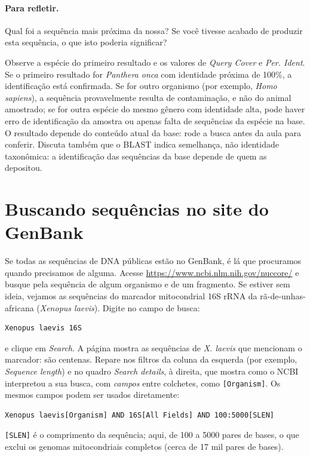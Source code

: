 \documentclass[11pt,a4paper]{article}
\newcommand{\ui}[1]{\textit{#1}}
\begin{document}
\paragraph{Para refletir.} Qual foi a sequência mais próxima da nossa? Se você tivesse acabado
de produzir esta sequência, o que isto poderia significar?

\begin{resposta}
Observe a espécie do primeiro resultado e os valores de \ui{Query Cover} e \ui{Per. Ident}.
Se o primeiro resultado for \emph{Panthera onca} com identidade próxima de 100\%, a
identificação está confirmada. Se for outro organismo (por exemplo, \emph{Homo sapiens}), a
sequência provavelmente resulta de contaminação, e não do animal amostrado; se for outra
espécie do mesmo gênero com identidade alta, pode haver erro de identificação da amostra ou
apenas falta de sequências da espécie na base. O resultado depende do conteúdo atual da base:
rode a busca antes da aula para conferir. Discuta também que o BLAST indica semelhança, não
identidade taxonômica: a identificação das sequências da base depende de quem as depositou.
\end{resposta}

\section{Buscando sequências no site do GenBank}

Se todas as sequências de DNA públicas estão no GenBank, é lá que procuramos quando precisamos
de alguma. Acesse \url{https://www.ncbi.nlm.nih.gov/nuccore/} e busque pela sequência de algum
organismo e de um fragmento. Se estiver sem ideia, vejamos as sequências do marcador
mitocondrial 16S rRNA da rã-de-unhas-africana (\emph{Xenopus laevis}). Digite no campo de busca:
\begin{Verbatim}
Xenopus laevis 16S
\end{Verbatim}
e clique em \ui{Search}. A página mostra as sequências de \emph{X. laevis} que mencionam o
marcador: são centenas. Repare nos filtros da coluna da esquerda (por exemplo, \ui{Sequence
length}) e no quadro \ui{Search details}, à direita, que mostra como o NCBI interpretou a sua
busca, com \emph{campos} entre colchetes, como \verb|[Organism]|. Os mesmos campos podem ser
usados diretamente:
\begin{Verbatim}
Xenopus laevis[Organism] AND 16S[All Fields] AND 100:5000[SLEN]
\end{Verbatim}
\verb|[SLEN]| é o comprimento da sequência; aqui, de 100 a 5000 pares de bases, o que exclui os
genomas mitocondriais completos (cerca de 17 mil pares de bases).
\end{document}
